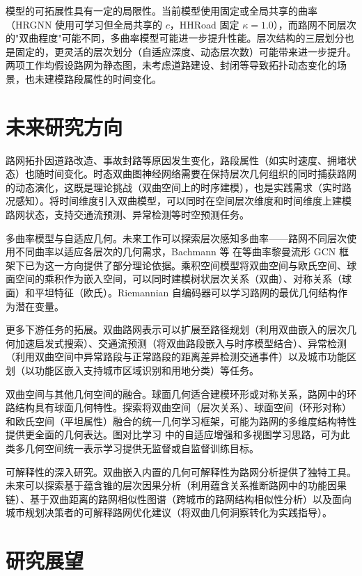 模型的可拓展性具有一定的局限性。当前模型使用固定或全局共享的曲率（HRGNN 使用可学习但全局共享的 $c$，HHRoad 固定 $\kappa=1.0$），而路网不同层次的"双曲程度"可能不同，多曲率模型可能进一步提升性能。层次结构的三层划分也是固定的，更灵活的层次划分（自适应深度、动态层次数）可能带来进一步提升。两项工作均假设路网为静态图，未考虑道路建设、封闭等导致拓扑动态变化的场景，也未建模路段属性的时间变化。

\section{未来研究方向}

路网拓扑因道路改造、事故封路等原因发生变化，路段属性（如实时速度、拥堵状态）也随时间变化。时态双曲图神经网络需要在保持层次几何组织的同时捕获路网的动态演化，这既是理论挑战（双曲空间上的时序建模），也是实践需求（实时路况感知）。将时间维度引入双曲模型，可以同时在空间层次维度和时间维度上建模路网状态，支持交通流预测\cite{jin2024stgnn,han2024bigst}、异常检测等时空预测任务。

多曲率模型与自适应几何。未来工作可以探索层次感知多曲率——路网不同层次使用不同曲率以适应各层次的几何需求，Bachmann 等\cite{bachmann2020kgcn} 在等曲率黎曼流形 GCN 框架下已为这一方向提供了部分理论依据。乘积空间模型将双曲空间与欧氏空间、球面空间的乘积作为嵌入空间，可以同时建模树状层次关系（双曲）、对称关系（球面）和平坦特征（欧氏）。Riemannian 自编码器可以学习路网的最优几何结构作为潜在变量。

更多下游任务的拓展。双曲路网表示可以扩展至路径规划（利用双曲嵌入的层次几何加速启发式搜索）、交通流预测（将双曲路段嵌入与时序模型结合）、异常检测（利用双曲空间中异常路段与正常路段的距离差异检测交通事件）以及城市功能区划（以功能区嵌入支持城市区域识别和用地分类）等任务。

双曲空间与其他几何空间的融合。球面几何适合建模环形或对称关系，路网中的环路结构具有球面几何特性。探索将双曲空间（层次关系）、球面空间（环形对称）和欧氏空间（平坦属性）融合的统一几何学习框架，可能为路网的多维度结构特性提供更全面的几何表达。图对比学习\cite{you2020graphcl,zhu2021gca} 中的自适应增强和多视图学习思路，可为此类多几何空间统一表示学习提供无监督或自监督训练目标。

可解释性的深入研究。双曲嵌入内置的几何可解释性为路网分析提供了独特工具。未来可以探索基于蕴含锥的层次因果分析（利用蕴含关系推断路网中的功能因果链）、基于双曲距离的路网相似性图谱（跨城市的路网结构相似性分析）以及面向城市规划决策者的可解释路网优化建议（将双曲几何洞察转化为实践指导）。

\section{研究展望}

